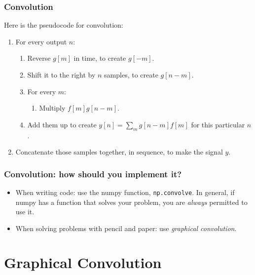 \documentclass{beamer}
\begin{document}
\begin{frame}
  \frametitle{Convolution}
  \centerline{}

  \vspace*{2mm}
  
  Here is the pseudocode for convolution:
  \begin{enumerate}
  \item For every output $n$:
    \begin{enumerate}
    \item Reverse $g[m]$ in time, to create $g[-m]$.
    \item Shift it to the right by $n$ samples, to create $g[n-m]$.
    \item For every $m$:
      \begin{enumerate}
      \item Multiply $f[m]g[n-m]$.
      \end{enumerate}
    \item Add them up to create $y[n] = \sum_m g[n-m] f[m]$ for this particular $n$.
    \end{enumerate}
    \item Concatenate those samples together, in sequence, to make the signal $y$.
  \end{enumerate}
\end{frame}

\begin{frame}
  \frametitle{Convolution: how should you implement it?}

  \begin{itemize}
    \item 
      When writing code: use the numpy function, {\tt np.convolve}.
      In general, if numpy has a function that solves your problem,
      you are {\em always} permitted to use it.
    \item
      When solving problems with pencil and paper: use {\em graphical
        convolution}.
  \end{itemize}
\end{frame}
  
\section[Graphical]{Graphical Convolution}
\setcounter{subsection}{1}
\end{document}
